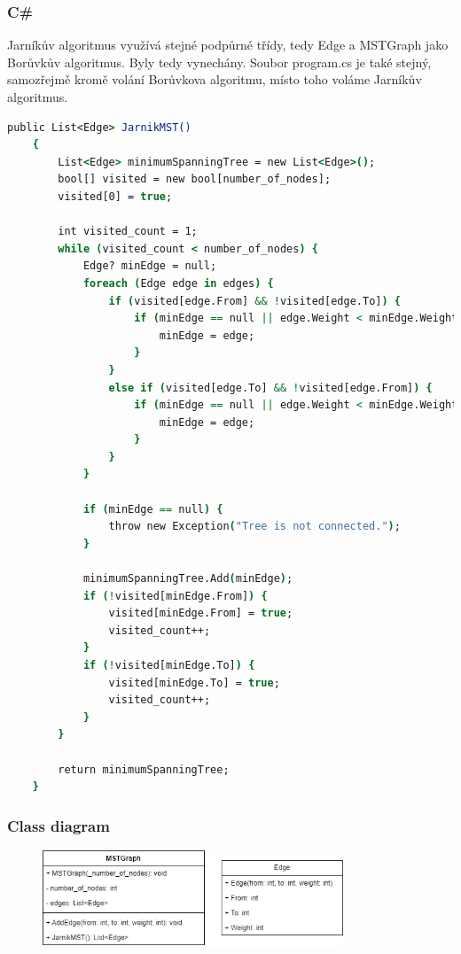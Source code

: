 \documentclass[11pt]{article}
\begin{document}
\subsubsection{C\#}
Jarníkův algoritmus využívá stejné podpůrné třídy, tedy Edge a MSTGraph jako Borůvkův algoritmus. Byly tedy vynechány. Soubor program.cs je také stejný, samozřejmě kromě volání Borůvkova algoritmu, místo toho voláme Jarníkův algoritmus.
\begin{lstlisting}[language=csh]
    public List<Edge> JarnikMST()
    {
        List<Edge> minimumSpanningTree = new List<Edge>();
        bool[] visited = new bool[number_of_nodes];
        visited[0] = true;

        int visited_count = 1;
        while (visited_count < number_of_nodes) {
            Edge? minEdge = null;
            foreach (Edge edge in edges) {
                if (visited[edge.From] && !visited[edge.To]) {
                    if (minEdge == null || edge.Weight < minEdge.Weight) {
                        minEdge = edge;
                    }
                }
                else if (visited[edge.To] && !visited[edge.From]) {
                    if (minEdge == null || edge.Weight < minEdge.Weight) {
                        minEdge = edge;
                    }
                }
            }

            if (minEdge == null) {
                throw new Exception("Tree is not connected.");
            }

            minimumSpanningTree.Add(minEdge);
            if (!visited[minEdge.From]) {
                visited[minEdge.From] = true;
                visited_count++;
            }
            if (!visited[minEdge.To]) {
                visited[minEdge.To] = true;
                visited_count++;
            }
        }

        return minimumSpanningTree;
    }
\end{lstlisting}

\subsubsection{Class diagram}
\begin{figure}[h]
	\centering
	\includegraphics[width=0.8\textwidth]{class_diagram_jarnik_alg.png}
\end{figure}
\end{document}
